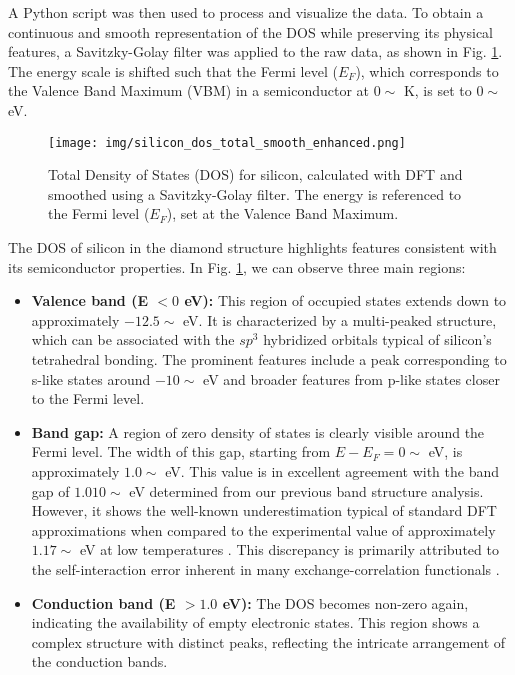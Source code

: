 \documentclass{article}
\begin{document}
A Python script was then used to process and visualize the data. To obtain a continuous and smooth representation of the DOS while preserving its physical features, a Savitzky-Golay filter \cite{savitzky_golay_1964} was applied to the raw data, as shown in Fig. \ref{fig:dos}. The energy scale is shifted such that the Fermi level ($E_F$), which corresponds to the Valence Band Maximum (VBM) in a semiconductor at $0\sim$ K, is set to $0\sim$ eV.

\begin{figure}[h!]
    \centering
    \texttt{[image: img/silicon\_dos\_total\_smooth\_enhanced.png]}
    \caption{Total Density of States (DOS) for silicon, calculated with DFT and smoothed using a Savitzky-Golay filter. The energy is referenced to the Fermi level ($E_F$), set at the Valence Band Maximum.}
    \label{fig:dos}
\end{figure}

The DOS of silicon in the diamond structure highlights features consistent with its semiconductor properties. In Fig. \ref{fig:dos}, we can observe three main regions:
\begin{itemize}
    \item \textbf{Valence band (E $< 0$ eV):} This region of occupied states extends down to approximately $-12.5\sim$ eV. It is characterized by a multi-peaked structure, which can be associated with the $sp^3$ hybridized orbitals typical of silicon's tetrahedral bonding. The prominent features include a peak corresponding to s-like states around $-10\sim$ eV and broader features from p-like states closer to the Fermi level.
    
    \item \textbf{Band gap:} A region of zero density of states is clearly visible around the Fermi level. The width of this gap, starting from $E-E_F = 0\sim$ eV, is approximately $1.0\sim$ eV. This value is in excellent agreement with the band gap of $1.010\sim$ eV determined from our previous band structure analysis. However, it shows the well-known underestimation typical of standard DFT approximations when compared to the experimental value of approximately $1.17\sim$ eV at low temperatures \cite{sze_2006, macfarlane_1958}. This discrepancy is primarily attributed to the self-interaction error inherent in many exchange-correlation functionals \cite{perdew_zunger_1981}.
    
    \item \textbf{Conduction band (E $> 1.0$ eV):} The DOS becomes non-zero again, indicating the availability of empty electronic states. This region shows a complex structure with distinct peaks, reflecting the intricate arrangement of the conduction bands.
\end{itemize}
\end{document}
